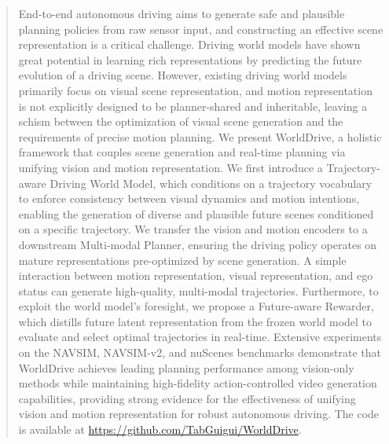\begin{abstract}
End-to-end autonomous driving aims to generate safe and plausible planning policies from raw sensor input, and constructing an effective scene representation is a critical challenge. Driving world models have shown great potential in learning rich representations by predicting the future evolution of a driving scene. However, existing driving world models primarily focus on visual scene representation, and motion representation is not explicitly designed to be planner-shared and inheritable, leaving a schism between the optimization of visual scene generation and the requirements of precise motion planning. We present WorldDrive, a holistic framework that couples scene generation and real-time planning via unifying vision and motion representation. We first introduce a Trajectory-aware Driving World Model, which conditions on a trajectory vocabulary to enforce consistency between visual dynamics and motion intentions, enabling the generation of diverse and plausible future scenes conditioned on a specific trajectory. We transfer the vision and motion encoders to a downstream Multi-modal Planner, ensuring the driving policy operates on mature representations pre-optimized by scene generation. A simple interaction between motion representation, visual representation, and ego status can generate high-quality, multi-modal trajectories. Furthermore, to exploit the world model’s foresight, we propose a Future-aware Rewarder, which distills future latent representation from the frozen world model to evaluate and select optimal trajectories in real-time. Extensive experiments on the NAVSIM, NAVSIM-v2, and nuScenes benchmarks demonstrate that WorldDrive achieves leading planning performance among vision-only methods while maintaining high-fidelity action-controlled video generation capabilities, providing strong evidence for the effectiveness of unifying vision and motion representation for robust autonomous driving. The code is available at \href{https://github.com/TabGuigui/WorldDrive}{\textcolor{mypink}{https://github.com/TabGuigui/WorldDrive}}.


\end{abstract}